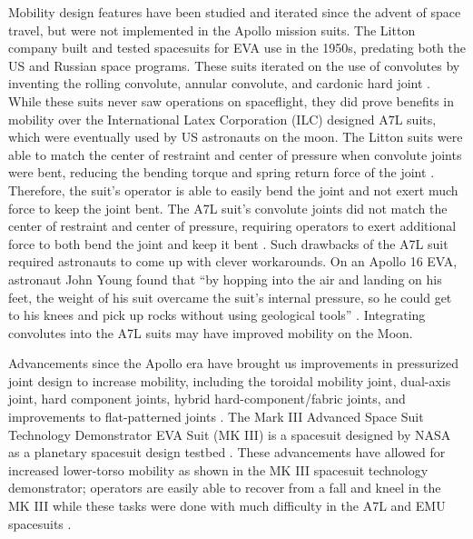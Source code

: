 \documentclass[defaultstyle,11pt]{comps}
\begin{document}
Mobility design features have been studied and iterated since the advent of space travel, but were not implemented in the Apollo mission suits.
The Litton company built and tested spacesuits for EVA use in the 1950s, predating both the US and Russian space programs.
These suits iterated on the use of convolutes by inventing the rolling convolute, annular convolute, and cardonic hard joint \citep{Harris2001}.
While these suits never saw operations on spaceflight, they did prove benefits in mobility over the International Latex Corporation (ILC) designed A7L suits, which were eventually used by US astronauts on the moon.
The Litton suits were able to match the center of restraint and center of pressure when convolute joints were bent, reducing the bending torque and spring return force of the joint \citep{Harris2001}.
Therefore, the suit's operator is able to easily bend the joint and not exert much force to keep the joint bent.
The A7L suit's convolute joints did not match the center of restraint and center of pressure, requiring operators to exert additional force to both bend the joint and keep it bent \citep{Harris2001}.
Such drawbacks of the A7L suit required astronauts to come up with clever workarounds.
On an Apollo 16 EVA, astronaut John Young found that ``by hopping into the air and landing on his feet, the weight of his suit overcame the suit's internal pressure, so he could get to his knees and pick up rocks without using geological tools'' \citep{Portree1997}.
Integrating convolutes into the A7L suits may have improved mobility on the Moon.

Advancements since the Apollo era have brought us improvements in pressurized joint design to increase mobility, including the toroidal mobility joint, dual-axis joint, hard component joints, hybrid hard-component/fabric joints, and improvements to flat-patterned joints \citep{Harris2001}.
The Mark III Advanced Space Suit Technology Demonstrator EVA Suit (MK III) is a spacesuit designed by NASA as a planetary spacesuit design testbed \citep{Kosmo1988}.
These advancements have allowed for increased lower-torso mobility as shown in the MK III spacesuit technology demonstrator; operators are easily able to recover from a fall and kneel in the MK III while these tasks were done with much difficulty in the A7L and EMU spacesuits \citep{Kosmo1998}.
\end{document}
